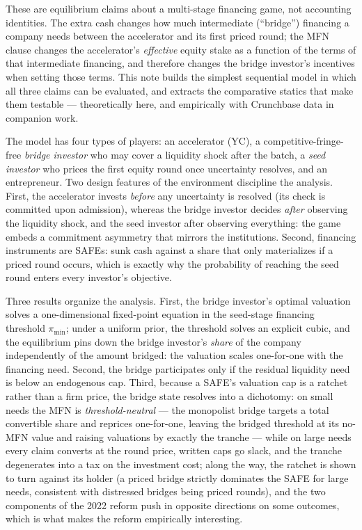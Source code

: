 \documentclass[11pt]{article}
\theoremstyle{definition}
\newcommand{\pimin}{\pi_{\min}}
\begin{document}
These are equilibrium claims about a multi-stage financing game, not accounting identities. The extra cash changes how much intermediate (``bridge'') financing a company needs between the accelerator and its first priced round; the MFN clause changes the accelerator's \emph{effective} equity stake as a function of the terms of that intermediate financing, and therefore changes the bridge investor's incentives when setting those terms. This note builds the simplest sequential model in which all three claims can be evaluated, and extracts the comparative statics that make them testable --- theoretically here, and empirically with Crunchbase data in companion work.

The model has four types of players: an accelerator (YC), a competitive-fringe-free \emph{bridge investor} who may cover a liquidity shock after the batch, a \emph{seed investor} who prices the first equity round once uncertainty resolves, and an entrepreneur. Two design features of the environment discipline the analysis. First, the accelerator invests \emph{before} any uncertainty is resolved (its check is committed upon admission), whereas the bridge investor decides \emph{after} observing the liquidity shock, and the seed investor after observing everything: the game embeds a commitment asymmetry that mirrors the institutions. Second, financing instruments are SAFEs: sunk cash against a share that only materializes if a priced round occurs, which is exactly why the probability of reaching the seed round enters every investor's objective.

Three results organize the analysis. First, the bridge investor's optimal valuation solves a one-dimensional fixed-point equation in the seed-stage financing threshold $\pimin$; under a uniform prior, the threshold solves an explicit cubic, and the equilibrium pins down the bridge investor's \emph{share} of the company independently of the amount bridged: the valuation scales one-for-one with the financing need. Second, the bridge participates only if the residual liquidity need is below an endogenous cap. Third, because a SAFE's valuation cap is a ratchet rather than a firm price, the bridge state resolves into a dichotomy: on small needs the MFN is \emph{threshold-neutral} --- the monopolist bridge targets a total convertible share and reprices one-for-one, leaving the bridged threshold at its no-MFN value and raising valuations by exactly the tranche --- while on large needs every claim converts at the round price, written caps go slack, and the tranche degenerates into a tax on the investment cost; along the way, the ratchet is shown to turn against its holder (a priced bridge strictly dominates the SAFE for large needs, consistent with distressed bridges being priced rounds), and the two components of the 2022 reform push in opposite directions on some outcomes, which is what makes the reform empirically interesting.
\end{document}
